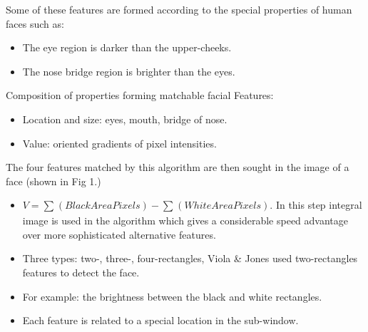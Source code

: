 \documentclass[conference]{IEEEtran}
\begin{document}
Some of these features are formed according to the special properties of human faces such as:
\begin{itemize}
\item The eye region is darker than the upper-cheeks.
\item The nose bridge region is brighter than the eyes.
\end{itemize}

Composition of properties forming matchable facial Features:
\begin{itemize}
\item Location and size: eyes, mouth, bridge of nose.
\item Value: oriented gradients of pixel intensities.
\end{itemize}

The four features matched by this algorithm are then sought in the image of a face (shown in Fig 1.)
\begin{itemize}
\item  $V = \sum_{}^{}(BlackAreaPixels) - \sum_{}^{}(WhiteAreaPixels)$.
In this step integral image is used in the algorithm which gives a considerable speed advantage over more sophisticated alternative features.
\item Three types: two-, three-, four-rectangles, Viola \& Jones used two-rectangles features to detect the face.
\item For example: the brightness between the black and white rectangles.
\item Each feature is related to a special location in the sub-window.
\end{itemize}
\end{document}
